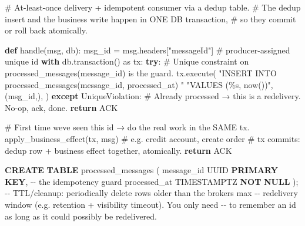 \documentclass[11pt]{article}
\newenvironment{Shaded}{\begin{snugshade}}{\end{snugshade}}
\newcommand{\CommentTok}[1]{\textcolor[rgb]{0.48,0.49,0.49}{#1}}
\newcommand{\ControlFlowTok}[1]{\textcolor[rgb]{0.99,0.74,0.29}{\textbf{#1}}}
\newcommand{\ImportTok}[1]{\textcolor[rgb]{0.15,0.68,0.38}{#1}}
\newcommand{\KeywordTok}[1]{\textcolor[rgb]{0.81,0.81,0.76}{\textbf{#1}}}
\newcommand{\NormalTok}[1]{\textcolor[rgb]{0.81,0.81,0.76}{#1}}
\newcommand{\OperatorTok}[1]{\textcolor[rgb]{0.81,0.81,0.76}{#1}}
\newcommand{\SpecialCharTok}[1]{\textcolor[rgb]{0.24,0.68,0.91}{#1}}
\newcommand{\StringTok}[1]{\textcolor[rgb]{0.96,0.31,0.31}{#1}}
\begin{document}

\begin{Shaded}
\begin{Highlighting}[]
\CommentTok{\# At{-}least{-}once delivery + idempotent consumer via a dedup table.}
\CommentTok{\# The dedup insert and the business write happen in ONE DB transaction,}
\CommentTok{\# so they commit or roll back atomically.}

\KeywordTok{def}\NormalTok{ handle(msg, db):}
\NormalTok{    msg\_id }\OperatorTok{=}\NormalTok{ msg.headers[}\StringTok{"messageId"}\NormalTok{]   }\CommentTok{\# producer{-}assigned unique id}
    \ControlFlowTok{with}\NormalTok{ db.transaction() }\ImportTok{as}\NormalTok{ tx:}
        \ControlFlowTok{try}\NormalTok{:}
            \CommentTok{\# Unique constraint on processed\_messages(message\_id) is the guard.}
\NormalTok{            tx.execute(}
                \StringTok{"INSERT INTO processed\_messages(message\_id, processed\_at) "}
                \StringTok{"VALUES (}\SpecialCharTok{\%s}\StringTok{, now())"}\NormalTok{,}
\NormalTok{                (msg\_id,),}
\NormalTok{            )}
        \ControlFlowTok{except}\NormalTok{ UniqueViolation:}
            \CommentTok{\# Already processed → this is a redelivery. No{-}op, ack, done.}
            \ControlFlowTok{return}\NormalTok{ ACK}

        \CommentTok{\# First time we\textquotesingle{}ve seen this id → do the real work in the SAME tx.}
\NormalTok{        apply\_business\_effect(tx, msg)     }\CommentTok{\# e.g. credit account, create order}
        \CommentTok{\# tx commits: dedup row + business effect together, atomically.}
    \ControlFlowTok{return}\NormalTok{ ACK}
\end{Highlighting}
\end{Shaded}


\begin{Shaded}
\begin{Highlighting}[]
\KeywordTok{CREATE} \KeywordTok{TABLE}\NormalTok{ processed\_messages (}
\NormalTok{    message\_id   UUID }\KeywordTok{PRIMARY} \KeywordTok{KEY}\NormalTok{,        }\CommentTok{{-}{-} the idempotency guard}
\NormalTok{    processed\_at TIMESTAMPTZ }\KeywordTok{NOT} \KeywordTok{NULL}
\NormalTok{);}
\CommentTok{{-}{-} TTL/cleanup: periodically delete rows older than the broker\textquotesingle{}s max}
\CommentTok{{-}{-} redelivery window (e.g. retention + visibility timeout). You only need}
\CommentTok{{-}{-} to remember an id as long as it could possibly be redelivered.}
\end{Highlighting}
\end{Shaded}
\end{document}
